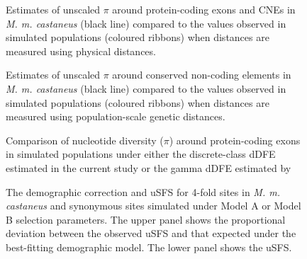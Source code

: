  \begin{figure}[h!]
   \centering      
   \noindent{}
 \caption[Estimates of unscaled $\pi$ around protein-coding exons and CNEs in \textit{M. m. castaneus} compared to the values observed in simulated populations - physical distance]{Estimates of unscaled $\pi$ around protein-coding exons and CNEs in \textit{M. m. castaneus} (black line) compared to the values observed in simulated populations (coloured ribbons) when distances are measured using physical distances.}
 \label{fig:CS3}
\end{figure}



 \begin{figure}[h!]
   \centering      
   \noindent{}
 \caption[Estimates of unscaled $\pi$ around protein-coding exons and CNEs in \textit{M. m. castaneus} compared to the values observed in simulated populations - genetic distance]{Estimates of unscaled $\pi$ around conserved non-coding elements in \textit{M. m. castaneus} (black line) compared to the values observed in simulated populations (coloured ribbons) when distances are measured using population-scale genetic distances.}
 \label{fig:CS4}
\end{figure}



 \begin{figure}[h!]
   \centering      
   \noindent{}
 \caption[Comparison of nucleotide diversity ($\pi$) around protein-coding exons in simulated populations assuming a discrete or a continuous model of the dDFE]{Comparison of nucleotide diversity ($\pi$) around protein-coding exons in simulated populations under either the discrete-class dDFE estimated in the current study or the gamma dDFE estimated by \cite{RN122}}
 \label{fig:CS5}
\end{figure}



 \begin{figure}[h!]
   \centering      
   \noindent{}
 \caption[The demographic correction and uSFS for 4-fold sites in \textit{M. m. castaneus} and synonymous sites simulated under Model A or Model B selection parameters]{The demographic correction and uSFS for 4-fold sites in \textit{M. m. castaneus} and synonymous sites simulated under Model A or Model B selection parameters. The upper panel shows the proportional deviation between the observed uSFS and that expected under the best-fitting demographic model. The lower panel shows the uSFS.}
 \label{fig:CS6}
\end{figure}



